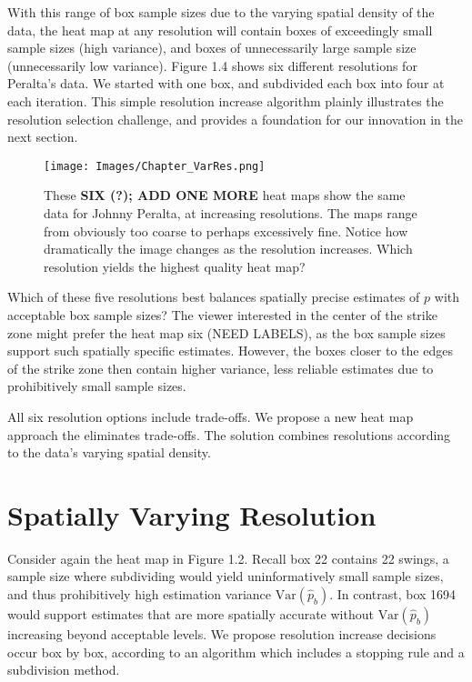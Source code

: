 With this range of box sample sizes due to the varying spatial density of the data, the heat map at any resolution will contain boxes of exceedingly small sample sizes (high variance), and boxes of unnecessarily large sample size (unnecessarily low variance). Figure 1.4 shows six different resolutions for Peralta's data. We started with one box, and subdivided each box into four at each iteration. This simple resolution increase algorithm plainly illustrates the resolution selection challenge, and provides a foundation for our innovation in the next section. 
        \begin{figure}[H]
      	\centering
      	\texttt{[image: Images/Chapter\_VarRes.png]} 
      	\caption{These {\bf SIX (?); ADD ONE MORE} heat maps show the same data for Johnny Peralta, at increasing resolutions. The maps range from obviously too coarse to perhaps excessively fine. Notice how dramatically the image changes as the resolution increases. Which resolution yields the highest quality heat map?}
      	\end{figure} 
Which of these five resolutions best balances spatially precise estimates of $p$ with acceptable box sample sizes? The viewer interested in the center of the strike zone might prefer the heat map six (NEED LABELS), as the box sample sizes support such spatially specific estimates. However, the boxes closer to the edges of the strike zone then contain higher variance, less reliable estimates due to prohibitively small sample sizes. 

All six resolution options include trade-offs. We propose a new heat map approach the eliminates trade-offs. The solution combines resolutions according to the data's varying spatial density.

\section{Spatially Varying Resolution} %

Consider again the heat map in Figure 1.2. Recall box 22 contains 22 swings, a sample size where subdividing would yield uninformatively small sample sizes, and thus prohibitively high estimation variance $\text{Var}(\hat{p}_{b})$. In contrast, box 1694 would support estimates that are more spatially accurate without $\text{Var}(\hat{p}_{b})$ increasing beyond acceptable levels. We propose resolution increase decisions occur box by box, according to an algorithm which includes a stopping rule and a subdivision method.

